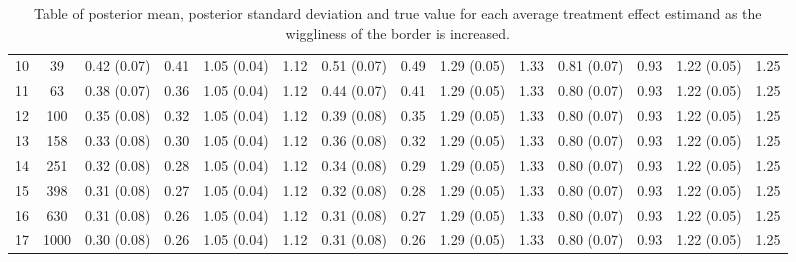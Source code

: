 \documentclass[letter]{article}
\begin{document}
\begin{landscape}
\begin{table}
\begin{tabular}{r|ccccccccccccc}
		10 & 39 & 0.42 (0.07) & 0.41 & 1.05 (0.04) & 1.12 & 0.51 (0.07) & 0.49 & 1.29 (0.05) & 1.33 & 0.81 (0.07) & 0.93 & 1.22 (0.05) & 1.25 \\
		11 & 63 & 0.38 (0.07) & 0.36 & 1.05 (0.04) & 1.12 & 0.44 (0.07) & 0.41 & 1.29 (0.05) & 1.33 & 0.80 (0.07) & 0.93 & 1.22 (0.05) & 1.25 \\
		12 & 100 & 0.35 (0.08) & 0.32 & 1.05 (0.04) & 1.12 & 0.39 (0.08) & 0.35 & 1.29 (0.05) & 1.33 & 0.80 (0.07) & 0.93 & 1.22 (0.05) & 1.25 \\
		13 & 158 & 0.33 (0.08) & 0.30 & 1.05 (0.04) & 1.12 & 0.36 (0.08) & 0.32 & 1.29 (0.05) & 1.33 & 0.80 (0.07) & 0.93 & 1.22 (0.05) & 1.25 \\
		14 & 251 & 0.32 (0.08) & 0.28 & 1.05 (0.04) & 1.12 & 0.34 (0.08) & 0.29 & 1.29 (0.05) & 1.33 & 0.80 (0.07) & 0.93 & 1.22 (0.05) & 1.25 \\
		15 & 398 & 0.31 (0.08) & 0.27 & 1.05 (0.04) & 1.12 & 0.32 (0.08) & 0.28 & 1.29 (0.05) & 1.33 & 0.80 (0.07) & 0.93 & 1.22 (0.05) & 1.25 \\
		16 & 630 & 0.31 (0.08) & 0.26 & 1.05 (0.04) & 1.12 & 0.31 (0.08) & 0.27 & 1.29 (0.05) & 1.33 & 0.80 (0.07) & 0.93 & 1.22 (0.05) & 1.25 \\
		17 & 1000 & 0.30 (0.08) & 0.26 & 1.05 (0.04) & 1.12 & 0.31 (0.08) & 0.26 & 1.29 (0.05) & 1.33 & 0.80 (0.07) & 0.93 & 1.22 (0.05) & 1.25 \\
	\end{tabular}
	\caption{Table of posterior mean, posterior standard deviation and true value for each average treatment effect estimand as the wiggliness of the border is increased.}
\end{table}
\end{landscape}
\restoregeometry

    
    
	
	

    
    
\end{document}
